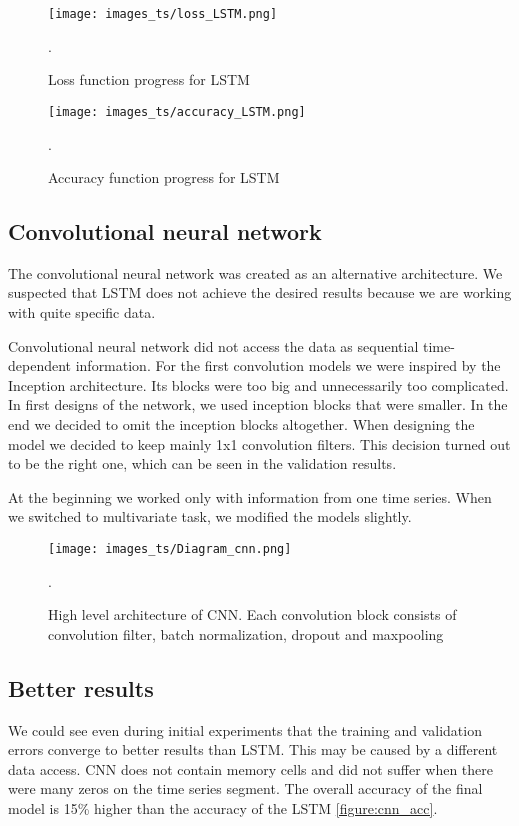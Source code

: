 \documentclass[thesis=M,english]{FITthesis}[2019/12/23]
\begin{document}
\begin{figure}[ht!]
    \centering
    \texttt{[image: images\_ts/loss\_LSTM.png]}
    \caption{Loss function progress for LSTM}. 
    \label{figure:lstm_loss}
    \centering
\end{figure}

\begin{figure}[ht!]
    \centering
    \texttt{[image: images\_ts/accuracy\_LSTM.png]}
    \caption{Accuracy function progress for LSTM}. 
    \label{figure:lstm_acc}
\end{figure}

\clearpage
\subsection{Convolutional neural network}
The convolutional neural network was created as an alternative architecture. We suspected that LSTM does not achieve the desired results because we are working with quite specific data.

Convolutional neural network did not access the data as sequential time-dependent information.
For the first convolution models we were inspired by the Inception architecture. Its blocks were too big and unnecessarily too complicated. In first designs of the network, we used inception blocks that were smaller. In the end we decided to omit the inception blocks altogether.
When designing the model we decided to keep mainly 1x1 convolution filters. This decision turned out to be the right one, which can be seen in the validation results. 

At the beginning we worked only with information from one time series.
When we switched to multivariate task, we modified the models slightly.

\begin{figure}[ht!]
    \centering
    \texttt{[image: images\_ts/Diagram\_cnn.png]}
    \caption{High level architecture of CNN. Each convolution block consists of convolution filter, batch normalization, dropout and maxpooling}. 
    \label{figure:cnn_diagram}
    \centering
\end{figure}

\subsection{Better results}
We could see even during initial experiments that the training and validation errors converge to better results than LSTM. This may be caused by a different data access. CNN does not contain memory cells and did not suffer when there were many zeros on the time series segment. The overall accuracy of the final model is 15\% higher than the accuracy of the LSTM \ref{figure:cnn_acc}.
\end{document}
